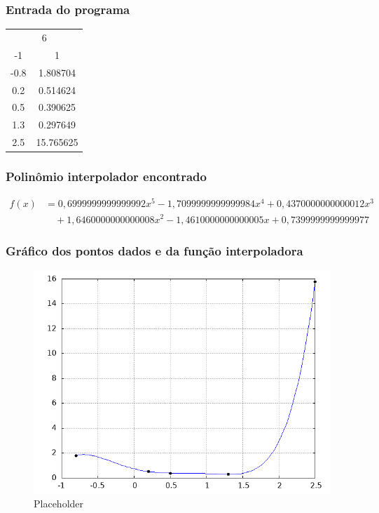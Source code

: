 \documentclass{article}
\begin{document}
        \subsubsection{Entrada do programa}
            \begin{table}[ht!]
            \centering
            \begin{tabular}{cc}
            \multicolumn{2}{c}{6} \\
            -1   & 1 \\
            -0.8 &  1.808704 \\
            0.2 &  0.514624 \\
            0.5 & 0.390625 \\
            1.3 & 0.297649 \\
            2.5 &  15.765625 \\
            \end{tabular}
            \end{table}
        
        \subsubsection{Polinômio interpolador encontrado}
            \begin{align*}
            f(x) &= 0{,}6999999999999992x^5 - 1{,}7099999999999984x^4 + 0{,}4370000000000012x^3 \\
                &\quad + 1{,}6460000000000008x^2 - 1{,}4610000000000005x + 0{,}7399999999999977
            \end{align*}


        \subsubsection{Gráfico dos pontos dados e da função interpoladora}
            \begin{figure}[H]
                \centering
                \includegraphics[width=0.5\linewidth]{exemplo1.png}
                \caption{Placeholder}
                \label{fig:placeholder}
            \end{figure}
\end{document}
